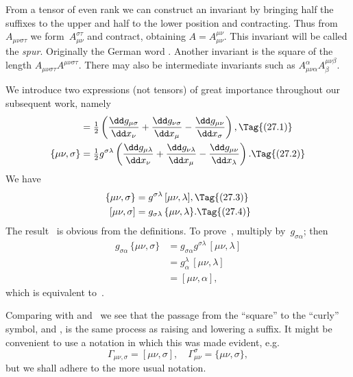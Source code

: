 \documentclass[12pt]{book}
\begin{document}
From a tensor of even rank we can construct an invariant by bringing
half the suffixes to the upper and half to the lower position and contracting.
Thus from~$A_{\mu\nu\sigma\tau}$ we form~$A_{\mu\nu}^{\sigma\tau}$ and contract, obtaining $A = A_{\mu\nu}^{\mu\nu}$. This invariant
will be called the \emph{spur}\footnotemark.\footnotetext
  {Originally the German word .}
Another invariant is the square of the
%
length $A_{\mu\nu\sigma\tau} A^{\mu\nu\sigma\tau}$. There may also be intermediate invariants such as
$A_{\mu\nu\alpha}^{\alpha} A_{\beta}^{\mu\nu\beta}$.

%
%

We introduce two expressions (not tensors) of great importance throughout
our subsequent work, namely
\begin{align*}
  [\mu\nu, \sigma]
  &= \tfrac{1}{2} \left(\frac{\dd g_{\mu\sigma}}{\dd x_{\nu}} + \frac{\dd g_{\nu\sigma}}{\dd x_{\mu}} - \frac{\dd g_{\mu\nu}}{\dd x_{\sigma}}\right),
  \Tag{(27.1)} \\
  \{\mu\nu, \sigma\}
  &= \tfrac{1}{2} g^{\sigma\lambda} \left(\frac{\dd g_{\mu\lambda}}{\dd x_{\nu}} + \frac{\dd g_{\nu\lambda}}{\dd x_{\mu}} - \frac{\dd g_{\mu\nu}}{\dd x_{\lambda}}\right).
\Tag{(27.2)}
\end{align*}
We have
\begin{align*}
  \{\mu\nu, \sigma\} &= g^{\sigma\lambda}\, [\mu\nu, \lambda],
  \Tag{(27.3)} \\
  [\mu\nu, \sigma] &= g_{\sigma\lambda}\, \{\mu\nu, \lambda\}.
  \Tag{(27.4)}
\end{align*}
The result~ is obvious from the definitions. To prove~, multiply 
by~$g_{\sigma\alpha}$; then
\begin{align*}
  g_{\sigma\alpha}\, \{\mu\nu, \sigma\}
  &= g_{\sigma\alpha} g^{\sigma\lambda}\, [\mu\nu, \lambda] \\
  &= g_{\alpha}^{\lambda}\, [\mu\nu, \lambda] \\
  &= [\mu\nu, \alpha],
\end{align*}
which is equivalent to~.

Comparing with  and~ we see that the passage from the
``square'' to the ``curly'' symbol, and , is the same process as raising
and lowering a suffix. It might be convenient to use a notation in which
this was made evident, e.g.\
\[
\Gamma_{\mu\nu, \sigma} = [\mu\nu, \sigma],\quad
\Gamma_{\mu\nu}^{\sigma} = \{\mu\nu, \sigma\},
\]
but we shall adhere to the more usual notation.
\end{document}
